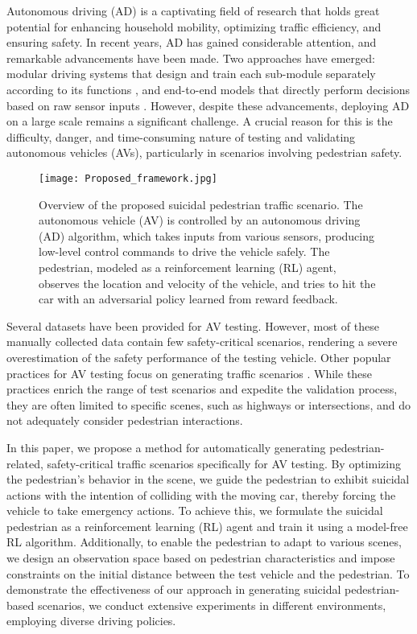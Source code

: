\documentclass[letterpaper, 10 pt, conference]{ieeeconf}
\begin{document}
Autonomous driving (AD) is a captivating field of research that holds great potential for enhancing household mobility, optimizing traffic efficiency, and ensuring safety. In recent years, AD has gained considerable attention, and remarkable advancements have been made. Two approaches have emerged: modular driving systems that design and train each sub-module separately according to its functions \cite{modular_survey, efficient_control_avoidance}, and end-to-end models that directly perform decisions based on raw sensor inputs \cite{learning_in_one_day,learningbycheating}. However, despite these advancements, deploying AD on a large scale remains a significant challenge. A crucial reason for this is the difficulty, danger, and time-consuming nature of testing and validating autonomous vehicles (AVs), particularly in scenarios involving pedestrian safety.



\begin{figure}[htbp]
    \centerline
    {
        \texttt{[image: Proposed\_framework.jpg]}
    }
    \caption{Overview of the proposed suicidal pedestrian traffic scenario. The autonomous vehicle (AV) is controlled by an autonomous driving (AD) algorithm, which takes inputs from various sensors, producing low-level control commands to drive the vehicle safely. The pedestrian, modeled as a reinforcement learning (RL) agent, observes the location and velocity of the vehicle, and tries to hit the car with an adversarial policy learned from reward feedback.}
    \label{fig:method_framework}
\end{figure}



Several datasets \cite{vision_kitti, waymo_dataset, semantickitti} have been provided for AV testing. However, most of these manually collected data contain few safety-critical scenarios, rendering a severe overestimation of the safety performance of the testing vehicle. Other popular practices for AV testing focus on generating traffic scenarios \cite{traffic_scenario_2, traffic_scenario_3, traffic_scenario_deeproad}. While these practices enrich the range of test scenarios and expedite the validation process, they are often limited to specific scenes, such as highways or intersections, and do not adequately consider pedestrian interactions.


In this paper, we propose a method for automatically generating pedestrian-related, safety-critical traffic scenarios specifically for AV testing. By optimizing the pedestrian's behavior in the scene, we guide the pedestrian to exhibit suicidal actions with the intention of colliding with the moving car, thereby forcing the vehicle to take emergency actions. To achieve this, we formulate the suicidal pedestrian as a reinforcement learning (RL) agent and train it using a model-free RL algorithm. Additionally, to enable the pedestrian to adapt to various scenes, we design an observation space based on pedestrian characteristics and impose constraints on the initial distance between the test vehicle and the pedestrian. To demonstrate the effectiveness of our approach in generating suicidal pedestrian-based scenarios, we conduct extensive experiments in different environments, employing diverse driving policies.
\end{document}
